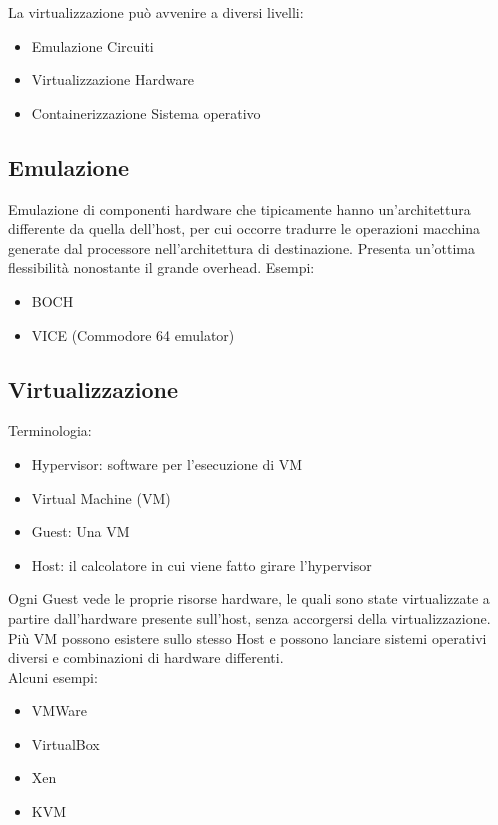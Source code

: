 \documentclass{article}
\begin{document}
		La virtualizzazione può avvenire a diversi livelli:
		\begin{itemize}
			\item Emulazione \textrightarrow  Circuiti
		    \item Virtualizzazione \textrightarrow  Hardware
		    \item Containerizzazione \textrightarrow  Sistema operativo
		\end{itemize}
		
		\subsection{Emulazione}
		Emulazione di componenti hardware che tipicamente hanno un'architettura differente da quella dell'host, per cui occorre tradurre le operazioni macchina generate dal processore nell'architettura di destinazione. Presenta un'ottima flessibilità nonostante il grande overhead.\newline
		Esempi:
		\begin{itemize}
		    \item  BOCH
		    \item  VICE (Commodore 64 emulator)
		\end{itemize}
		
		\subsection{Virtualizzazione}
		Terminologia:
		\begin{itemize}
		    \item Hypervisor: software per l'esecuzione di VM
		    \item Virtual Machine (VM) 
		    \item Guest: Una VM
		    \item Host: il calcolatore in cui viene fatto girare l'hypervisor
		\end{itemize}
		Ogni Guest vede le proprie risorse hardware, le quali sono state virtualizzate a partire dall'hardware presente sull'host, senza accorgersi della virtualizzazione. Più VM possono esistere sullo stesso Host e possono lanciare sistemi operativi diversi e combinazioni di hardware differenti.\\
		Alcuni esempi:
		\begin{itemize}
		    \item VMWare
		    \item VirtualBox
		    \item Xen
		    \item KVM
		\end{itemize}
		
\end{document}
